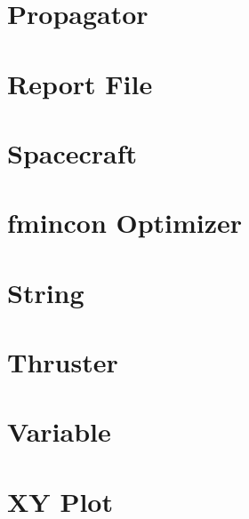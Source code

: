 \section{Propagator}


\section{Report File}


\section{Spacecraft}







\section{fmincon Optimizer}


\section{String}


\section{Thruster}


\section{Variable}


\section{XY Plot}



